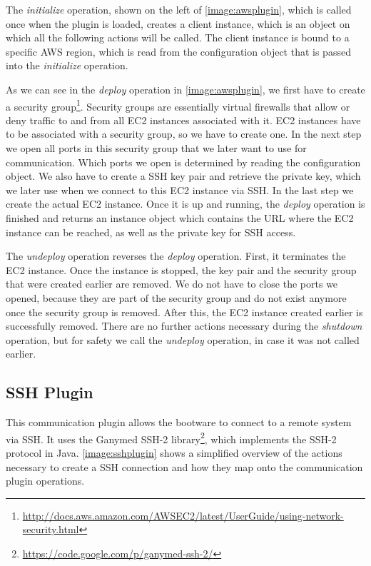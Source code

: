 The \textit{initialize} operation, shown on the left of \autoref{image:awsplugin}, which is called once when the plugin is loaded, creates a client instance, which is an object on which all the following actions will be called.
The client instance is bound to a specific AWS region, which is read from the configuration object that is passed into the \textit{initialize} operation.

As we can see in the \textit{deploy} operation in \autoref{image:awsplugin}, we first have to create a security group\footnote{\url{http://docs.aws.amazon.com/AWSEC2/latest/UserGuide/using-network-security.html}}.
Security groups are essentially virtual firewalls that allow or deny traffic to and from all EC2 instances associated with it.
EC2 instances have to be associated with a security group, so we have to create one.
In the next step we open all ports in this security group that we later want to use for communication.
Which ports we open is determined by reading the configuration object.
We also have to create a SSH key pair and retrieve the private key, which we later use when we connect to this EC2 instance via SSH.
In the last step we create the actual EC2 instance.
Once it is up and running, the \textit{deploy} operation is finished and returns an instance object which contains the URL where the EC2 instance can be reached, as well as the private key for SSH access.

The \textit{undeploy} operation reverses the \textit{deploy} operation.
First, it terminates the EC2 instance.
Once the instance is stopped, the key pair and the security group that were created earlier are removed.
We do not have to close the ports we opened, because they are part of the security group and do not exist anymore once the security group is removed.
After this, the EC2 instance created earlier is successfully removed.
There are no further actions necessary during the \textit{shutdown} operation, but for safety we call the \textit{undeploy} operation, in case it was not called earlier.

\subsection{SSH Plugin}

This communication plugin allows the bootware to connect to a remote system via SSH.
It uses the Ganymed SSH-2 library\footnote{\url{https://code.google.com/p/ganymed-ssh-2/}}, which implements the SSH-2 protocol in Java.
\autoref{image:sshplugin} shows a simplified overview of the actions necessary to create a SSH connection and how they map onto the communication plugin operations.

